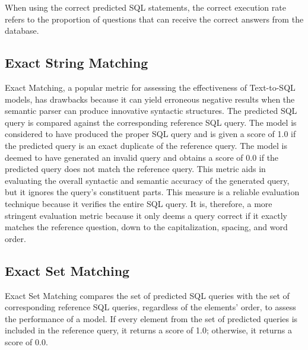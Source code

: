When using the correct predicted SQL statements, the correct execution rate refers to the proportion of questions that can receive the correct answers from the database.




\subsection{Exact String Matching}

Exact Matching\cite{xu_sqlnet_2017}, a popular metric for assessing the effectiveness of Text-to-SQL models, has drawbacks because it can yield erroneous negative results when the semantic parser can produce innovative syntactic structures. The predicted SQL query is compared against the corresponding reference SQL query. The model is considered to have produced the proper SQL query and is given a score of 1.0 if the predicted query is an exact duplicate of the reference query. The model is deemed to have generated an invalid query and obtains a score of 0.0 if the predicted query does not match the reference query. This metric aids in evaluating the overall syntactic and semantic accuracy of the generated query, but it ignores the query's constituent parts. This measure is a reliable evaluation technique because it verifies the entire SQL query. It is, therefore, a more stringent evaluation metric because it only deems a query correct if it exactly matches the reference question, down to the capitalization, spacing, and word order.


\subsection{Exact Set Matching}

Exact Set Matching compares the set of predicted SQL queries with the set of corresponding reference SQL queries, regardless of the elements' order, to assess the performance of a model. If every element from the set of predicted queries is included in the reference query, it returns a score of 1.0; otherwise, it returns a score of 0.0.

